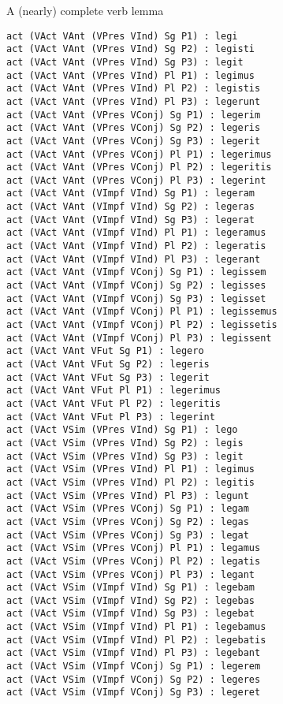 \documentclass{beamer}
\begin{document}
\begin{frame}[fragile]{A (nearly) complete verb lemma}
\begin{example}%
\begin{multicols}{5}
{\fontsize{2pt}{0.15em}\selectfont
\begin{Verbatim}
act (VAct VAnt (VPres VInd) Sg P1) : legi
act (VAct VAnt (VPres VInd) Sg P2) : legisti
act (VAct VAnt (VPres VInd) Sg P3) : legit
act (VAct VAnt (VPres VInd) Pl P1) : legimus
act (VAct VAnt (VPres VInd) Pl P2) : legistis
act (VAct VAnt (VPres VInd) Pl P3) : legerunt
act (VAct VAnt (VPres VConj) Sg P1) : legerim
act (VAct VAnt (VPres VConj) Sg P2) : legeris
act (VAct VAnt (VPres VConj) Sg P3) : legerit
act (VAct VAnt (VPres VConj) Pl P1) : legerimus
act (VAct VAnt (VPres VConj) Pl P2) : legeritis
act (VAct VAnt (VPres VConj) Pl P3) : legerint
act (VAct VAnt (VImpf VInd) Sg P1) : legeram
act (VAct VAnt (VImpf VInd) Sg P2) : legeras
act (VAct VAnt (VImpf VInd) Sg P3) : legerat
act (VAct VAnt (VImpf VInd) Pl P1) : legeramus
act (VAct VAnt (VImpf VInd) Pl P2) : legeratis
act (VAct VAnt (VImpf VInd) Pl P3) : legerant
act (VAct VAnt (VImpf VConj) Sg P1) : legissem
act (VAct VAnt (VImpf VConj) Sg P2) : legisses
act (VAct VAnt (VImpf VConj) Sg P3) : legisset
act (VAct VAnt (VImpf VConj) Pl P1) : legissemus
act (VAct VAnt (VImpf VConj) Pl P2) : legissetis
act (VAct VAnt (VImpf VConj) Pl P3) : legissent
act (VAct VAnt VFut Sg P1) : legero
act (VAct VAnt VFut Sg P2) : legeris
act (VAct VAnt VFut Sg P3) : legerit
act (VAct VAnt VFut Pl P1) : legerimus
act (VAct VAnt VFut Pl P2) : legeritis
act (VAct VAnt VFut Pl P3) : legerint
act (VAct VSim (VPres VInd) Sg P1) : lego
act (VAct VSim (VPres VInd) Sg P2) : legis
act (VAct VSim (VPres VInd) Sg P3) : legit
act (VAct VSim (VPres VInd) Pl P1) : legimus
act (VAct VSim (VPres VInd) Pl P2) : legitis
act (VAct VSim (VPres VInd) Pl P3) : legunt
act (VAct VSim (VPres VConj) Sg P1) : legam
act (VAct VSim (VPres VConj) Sg P2) : legas
act (VAct VSim (VPres VConj) Sg P3) : legat
act (VAct VSim (VPres VConj) Pl P1) : legamus
act (VAct VSim (VPres VConj) Pl P2) : legatis
act (VAct VSim (VPres VConj) Pl P3) : legant
act (VAct VSim (VImpf VInd) Sg P1) : legebam
act (VAct VSim (VImpf VInd) Sg P2) : legebas
act (VAct VSim (VImpf VInd) Sg P3) : legebat
act (VAct VSim (VImpf VInd) Pl P1) : legebamus
act (VAct VSim (VImpf VInd) Pl P2) : legebatis
act (VAct VSim (VImpf VInd) Pl P3) : legebant
act (VAct VSim (VImpf VConj) Sg P1) : legerem
act (VAct VSim (VImpf VConj) Sg P2) : legeres
act (VAct VSim (VImpf VConj) Sg P3) : legeret

\end{Verbatim}}
\end{multicols}
\end{example}
\end{frame}
\end{document}
